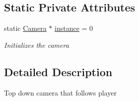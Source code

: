 \subsection*{Static Private Attributes}
\begin{DoxyCompactItemize}
\item 
static \hyperlink{class_camera}{Camera} $\ast$ \hyperlink{class_camera_af95982469bc5cdc45c48f464b9ff05b9}{instance} = 0
\begin{DoxyCompactList}\small\item\em Initializes the camera \end{DoxyCompactList}\end{DoxyCompactItemize}


\subsection{Detailed Description}
Top down camera that follows player 



 

 


